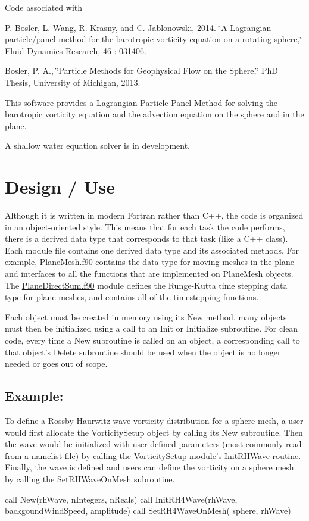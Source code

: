 Code associated with

P. Bosler, L. Wang, R. Krasny, and C. Jablonowski, 2014. \char`\"{}\+A Lagrangian particle/panel method for the barotropic vorticity equation on a rotating sphere,\char`\"{} Fluid Dynamics Research, 46 \+: 031406.

Bosler, P. A., \char`\"{}\+Particle Methods for Geophysical Flow on the Sphere,\char`\"{} Ph\+D Thesis, University of Michigan, 2013.

This software provides a Lagrangian Particle-\/\+Panel Method for solving the barotropic vorticity equation and the advection equation on the sphere and in the plane.

A shallow water equation solver is in development.

\section*{Design / Use }

Although it is written in modern Fortran rather than C++, the code is organized in an object-\/oriented style. This means that for each task the code performs, there is a derived data type that corresponds to that task (like a C++ class). Each module file contains one derived data type and its associated methods. For example, \hyperlink{PlaneMesh_8f90}{Plane\+Mesh.\+f90} contains the data type for moving meshes in the plane and interfaces to all the functions that are implemented on Plane\+Mesh objects. The \hyperlink{PlaneDirectSum_8f90}{Plane\+Direct\+Sum.\+f90} module defines the Runge-\/\+Kutta time stepping data type for plane meshes, and contains all of the timestepping functions.

Each object must be created in memory using its New method, many objects must then be initialized using a call to an Init or Initialize subroutine. For clean code, every time a New subroutine is called on an object, a corresponding call to that object's Delete subroutine should be used when the object is no longer needed or goes out of scope.

\subsection*{Example\+: }

To define a Rossby-\/\+Haurwitz wave vorticity distribution for a sphere mesh, a user would first allocate the Vorticity\+Setup object by calling its New subroutine. Then the wave would be initialized with user-\/defined parameters (most commonly read from a namelist file) by calling the Vorticity\+Setup module's Init\+R\+H\+Wave routine. Finally, the wave is defined and users can define the vorticity on a sphere mesh by calling the Set\+R\+H\+Wave\+On\+Mesh subroutine. \begin{DoxyVerb}call New(rhWave, nIntegers, nReals)
call InitRH4Wave(rhWave, backgoundWindSpeed, amplitude)
call SetRH4WaveOnMesh( sphere, rhWave)
\end{DoxyVerb}


